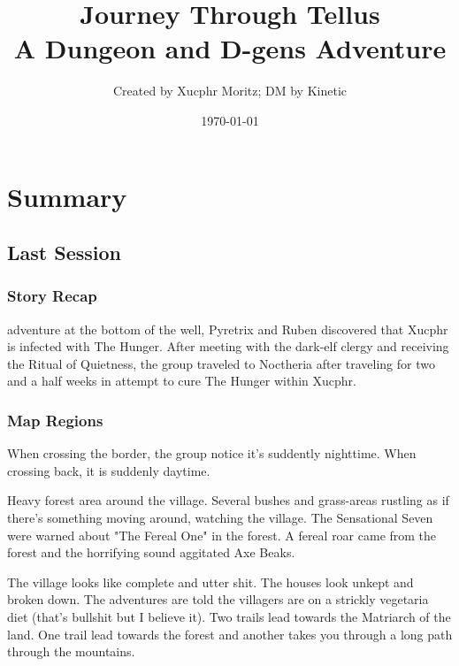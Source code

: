 \documentclass[letterpaper,twocolumn,openany,nodeprecatedcode]{dndbook}
\title{Journey Through Tellus \\
\large A Dungeon and D-gens Adventure}
\author{Created by Xucphr Moritz; DM by Kinetic}
\date{\today}
\begin{document}
\frontmatter

\maketitle

\tableofcontents

\mainmatter%

\part{Summary}


\chapter*{Last Session}
\section{Story Recap}
 adventure at the bottom of the well, Pyretrix and Ruben discovered that Xucphr is infected with The Hunger. After meeting with the dark-elf clergy and receiving the Ritual of Quietness, the group traveled to Noctheria after traveling for two and a half weeks in attempt to cure The Hunger within Xucphr.

\section{Map Regions}


When crossing the border, the group notice it's suddently nighttime. When crossing back, it is suddenly daytime.

	Heavy forest area around the village. Several bushes and grass-areas rustling as if there's something moving around, watching the village. The Sensational Seven were warned about "The Fereal One" in the forest. A fereal roar came from the forest and the horrifying sound aggitated Axe Beaks.
	
The village looks like complete and utter shit. The houses look unkept and broken down. The adventures are told the villagers are on a strickly vegetaria diet (that's bullshit but I believe it). Two trails lead towards the Matriarch of the land. One trail lead towards the forest and another takes you through a long path through the mountains.
\end{document}
